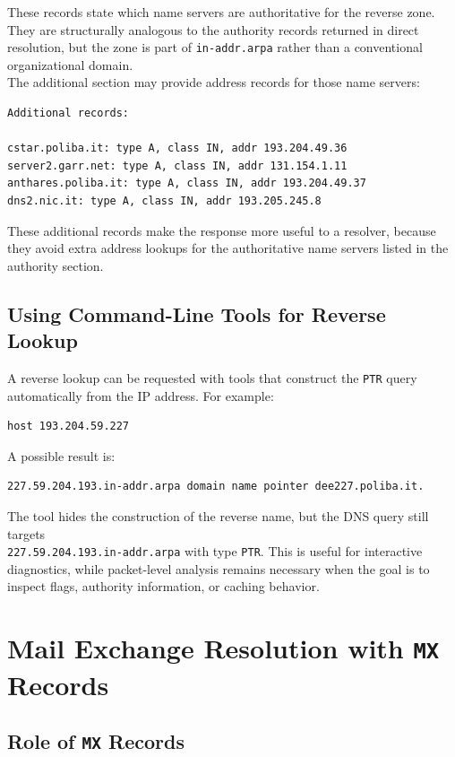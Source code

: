 \documentclass{scrbook}
\begin{document}
	These records state which name servers are authoritative for the reverse zone. They are structurally analogous to the authority records returned in direct resolution, but the zone is part of \texttt{in-addr.arpa} rather than a conventional organizational domain.\\
	
	The additional section may provide address records for those name servers:
	\begin{lstlisting}
Additional records:

cstar.poliba.it: type A, class IN, addr 193.204.49.36
server2.garr.net: type A, class IN, addr 131.154.1.11
anthares.poliba.it: type A, class IN, addr 193.204.49.37
dns2.nic.it: type A, class IN, addr 193.205.245.8
	\end{lstlisting}
	
	These additional records make the response more useful to a resolver, because they avoid extra address lookups for the authoritative name servers listed in the authority section.
	
	\subsection{Using Command-Line Tools for Reverse Lookup}
	
	A reverse lookup can be requested with tools that construct the \texttt{PTR} query automatically from the IP address. For example:
	\begin{lstlisting}
host 193.204.59.227
	\end{lstlisting}
	
	A possible result is:
	\begin{lstlisting}
227.59.204.193.in-addr.arpa domain name pointer dee227.poliba.it.
	\end{lstlisting}
	
	The tool hides the construction of the reverse name, but the DNS query still targets\\
	\texttt{227.59.204.193.in-addr.arpa} with type \texttt{PTR}. This is useful for interactive diagnostics, while packet-level analysis remains necessary when the goal is to inspect flags, authority information, or caching behavior.
	
	\newpage
	\section{Mail Exchange Resolution with \texttt{MX} Records}
	
	\subsection{Role of \texttt{MX} Records}
	
\end{document}
